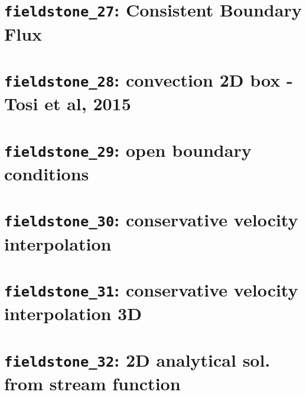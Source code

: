 \documentclass[a4paper]{article}
\begin{document}
\newpage
\section{{\tt fieldstone\_27}: Consistent Boundary Flux \label{f27}}


\newpage
\section{{\tt fieldstone\_28}: convection 2D box - Tosi et al, 2015 \label{f28}}


\newpage
\section{{\tt fieldstone\_29}: open boundary conditions \label{f29}}


\newpage
\section{{\tt fieldstone\_30}: conservative velocity interpolation \label{f30}}


\newpage
\section{{\tt fieldstone\_31}: conservative velocity interpolation 3D \label{f31}}
%
\newpage %
\section{{\tt fieldstone\_32}: 2D analytical sol. from stream function \label{f32}}
\newpage %
\end{document}
